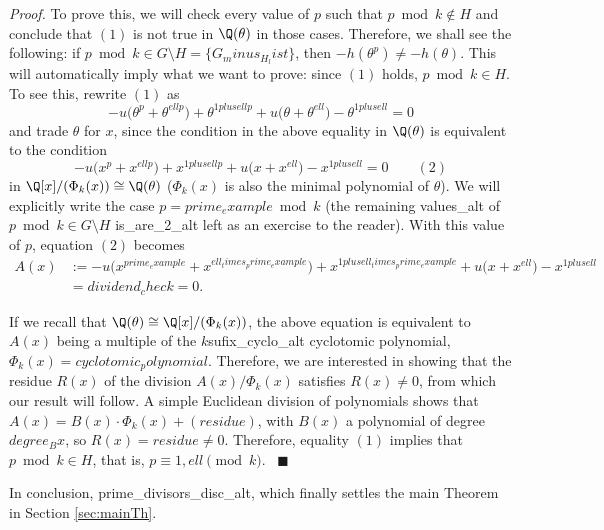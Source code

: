 \textit{Proof.} To prove this, we will check every value of $p$ such that $p \bmod{{k}}\notin H$ and conclude that $(1)$ is not true in $\Q(\theta)$ in those cases. Therefore, we shall see the following: if $p \bmod{{k}}\in G\setminus H=\{{G_minus_H_list}\}$, then $-h(\theta^p)\neq -h(\theta)$. This will automatically imply what we want to prove: since $(1)$ holds, $p \bmod{{k}}\in H$. To see this, rewrite $(1)$ as
\begin{equation}\label{eq:equalityQ}
-{u}\big(\theta^{p}+\theta^{{ell}p}\big)+\theta^{{1plusell}p}+{u}\big(\theta+\theta^{{ell}}\big)-\theta^{{1plusell}}=0
\end{equation}
and trade $\theta$ for $x$, since the condition in the above equality in $\Q(\theta)$ is equivalent to the condition
\begin{equation}\label{eq:polycheck0}
-{u}\big(x^p+x^{{ell}p}\big)+x^{{1plusell}p}+{u}\big(x+x^{{ell}}\big)-x^{{1plusell}}=0 \quad \quad (2)
\end{equation}
in $\Q[x]/(\Phi_{{k}}(x))\cong\Q(\theta)$ ($\Phi_{{k}}(x)$ is also the minimal polynomial of $\theta$). We will explicitly write the case $p={prime_example} \bmod{{k}}$ (the remaining {values_alt} of $p \bmod{{k}}\in G\setminus H$ {is_are_2_alt} left as an exercise to the reader). With this value of $p$, equation $(2)$ becomes
\begin{align*}
A(x)&:=-{u}\big(x^{{prime_example}}+x^{{ell_times_prime_example}}\big)+x^{{1plusell_times_prime_example}}+{u}\big(x+x^{{ell}}\big)-x^{{1plusell}}\\
&={dividend_check}=0.
\end{align*}

If we recall that $\Q(\theta)\cong\Q[x]/(\Phi_{{k}}(x))$, the above equation is equivalent to $A(x)$ being a multiple of the ${k}${sufix_cyclo_alt} cyclotomic polynomial, $\Phi_{{k}}(x) = {cyclotomic_polynomial}$. Therefore, we are interested in showing that the residue $R(x)$ of the division $A(x)/\Phi_{{k}}(x)$ satisfies $R(x)\neq 0$, from which our result will follow. A simple Euclidean division of polynomials shows that $A(x)=B(x)\cdot\Phi_{{k}}(x)+({residue})$, with $B(x)$ a polynomial of degree ${degree_Bx}$, so $R(x)={residue} \neq 0$. Therefore, equality $(1)$ implies that $p \bmod{{k}} \in H$, that is, $p\equiv 1,{ell}\pmod{{k}}$. \ $\blacksquare$

In conclusion, {prime_divisors_disc_alt}, which finally settles the main Theorem in Section \ref{sec:mainTh}.
